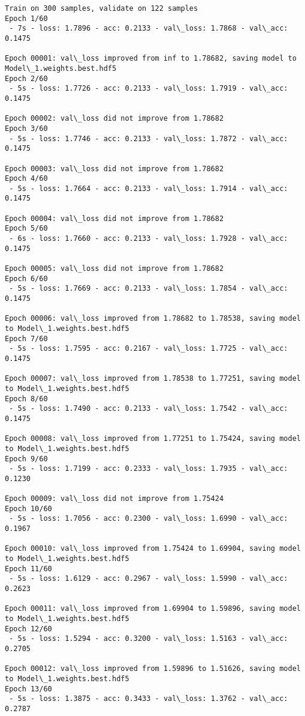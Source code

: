 \documentclass[11pt]{article}
\begin{document}
    \begin{Verbatim}[commandchars=\\\{\}]
Train on 300 samples, validate on 122 samples
Epoch 1/60
 - 7s - loss: 1.7896 - acc: 0.2133 - val\_loss: 1.7868 - val\_acc: 0.1475

Epoch 00001: val\_loss improved from inf to 1.78682, saving model to Model\_1.weights.best.hdf5
Epoch 2/60
 - 5s - loss: 1.7726 - acc: 0.2133 - val\_loss: 1.7919 - val\_acc: 0.1475

Epoch 00002: val\_loss did not improve from 1.78682
Epoch 3/60
 - 5s - loss: 1.7746 - acc: 0.2133 - val\_loss: 1.7872 - val\_acc: 0.1475

Epoch 00003: val\_loss did not improve from 1.78682
Epoch 4/60
 - 5s - loss: 1.7664 - acc: 0.2133 - val\_loss: 1.7914 - val\_acc: 0.1475

Epoch 00004: val\_loss did not improve from 1.78682
Epoch 5/60
 - 6s - loss: 1.7660 - acc: 0.2133 - val\_loss: 1.7928 - val\_acc: 0.1475

Epoch 00005: val\_loss did not improve from 1.78682
Epoch 6/60
 - 5s - loss: 1.7669 - acc: 0.2133 - val\_loss: 1.7854 - val\_acc: 0.1475

Epoch 00006: val\_loss improved from 1.78682 to 1.78538, saving model to Model\_1.weights.best.hdf5
Epoch 7/60
 - 5s - loss: 1.7595 - acc: 0.2167 - val\_loss: 1.7725 - val\_acc: 0.1475

Epoch 00007: val\_loss improved from 1.78538 to 1.77251, saving model to Model\_1.weights.best.hdf5
Epoch 8/60
 - 5s - loss: 1.7490 - acc: 0.2133 - val\_loss: 1.7542 - val\_acc: 0.1475

Epoch 00008: val\_loss improved from 1.77251 to 1.75424, saving model to Model\_1.weights.best.hdf5
Epoch 9/60
 - 5s - loss: 1.7199 - acc: 0.2333 - val\_loss: 1.7935 - val\_acc: 0.1230

Epoch 00009: val\_loss did not improve from 1.75424
Epoch 10/60
 - 5s - loss: 1.7056 - acc: 0.2300 - val\_loss: 1.6990 - val\_acc: 0.1967

Epoch 00010: val\_loss improved from 1.75424 to 1.69904, saving model to Model\_1.weights.best.hdf5
Epoch 11/60
 - 5s - loss: 1.6129 - acc: 0.2967 - val\_loss: 1.5990 - val\_acc: 0.2623

Epoch 00011: val\_loss improved from 1.69904 to 1.59896, saving model to Model\_1.weights.best.hdf5
Epoch 12/60
 - 5s - loss: 1.5294 - acc: 0.3200 - val\_loss: 1.5163 - val\_acc: 0.2705

Epoch 00012: val\_loss improved from 1.59896 to 1.51626, saving model to Model\_1.weights.best.hdf5
Epoch 13/60
 - 5s - loss: 1.3875 - acc: 0.3433 - val\_loss: 1.3762 - val\_acc: 0.2787


\end{Verbatim}
\end{document}
